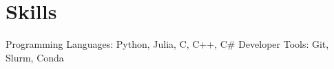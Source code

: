 \section{Skills}
Programming Languages: Python, Julia, C, C++, C\#
Developer Tools: Git, Slurm, Conda



    
